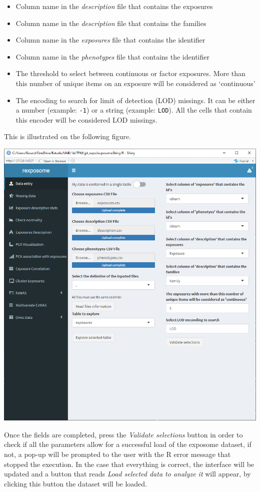 \documentclass[
]{book}
\providecommand{\tightlist}{%
  \setlength{\itemsep}{0pt}\setlength{\parskip}{0pt}}
\begin{document}
\begin{itemize}
\tightlist
\item
  Column name in the \emph{description} file that contains the exposures
\item
  Column name in the \emph{description} file that contains the families
\item
  Column name in the \emph{exposures} file that contains the identifier
\item
  Column name in the \emph{phenotypes} file that contains the identifier
\item
  The threshold to select between continuous or factor exposures. More than this number of unique items on an exposure will be considered as `continuous'
\item
  The encoding to search for limit of detection (LOD) missings. It can be either a number (example: \texttt{-1}) or a string (example: \texttt{LOD}). All the cells that contain this encoder will be considered LOD missings.
\end{itemize}

This is illustrated on the following figure.

\includegraphics{images/analysis1_2_2.png}

Once the fields are completed, press the \emph{Validate selections} button in order to check if all the parameters allow for a successful load of the exposome dataset, if not, a pop-up will be prompted to the user with the R error message that stopped the execution. In the case that everything is correct, the interface will be updated and a button that reads \emph{Load selected data to analyze it} will appear, by clicking this button the dataset will be loaded.
\end{document}
